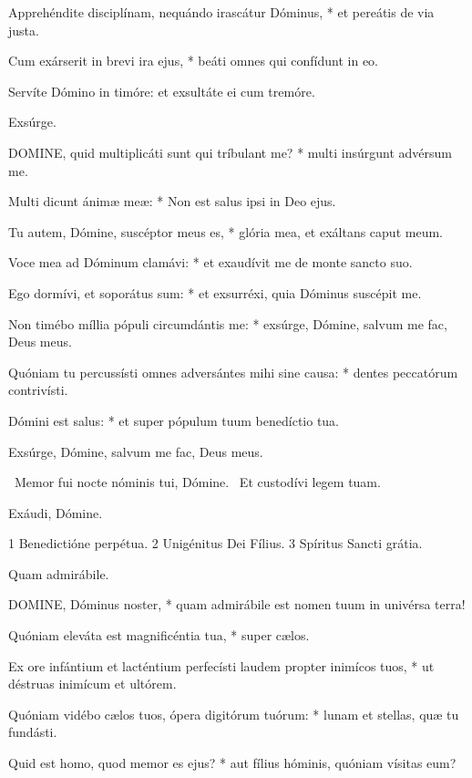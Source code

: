 Apprehéndite disciplínam, nequándo irascátur Dóminus, * et pereátis de via justa.

Cum exárserit in brevi ira ejus, * beáti omnes qui confídunt in eo.

 Servíte Dómino in timóre: et exsultáte ei cum tremóre.

 Exsúrge.


\lettrine[lines=2]{D}{OMINE}, quid multiplicáti sunt qui tríbulant me? * multi insúrgunt advérsum me.

Multi dicunt ánimæ meæ: * Non est salus ipsi in Deo ejus.

Tu autem, Dómine, suscéptor meus es, * glória mea, et exáltans caput meum.

Voce mea ad Dóminum clamávi: * et exaudívit me de monte sancto suo.

Ego dormívi, et soporátus sum: * et exsurréxi, quia Dóminus suscépit me.

Non timébo míllia pópuli circumdántis me: * exsúrge, Dómine, salvum me fac, Deus meus.

Quóniam tu percussísti omnes adversántes mihi sine causa: * dentes peccatórum contrivísti.

Dómini est salus: * et super pópulum tuum benedíctio tua.

 Exsúrge, Dómine, salvum me fac, Deus meus.

\V\ Memor fui nocte nóminis tui, Dómine. \R\ Et custodívi legem tuam.

 Exáudi, Dómine.

 1 Benedictióne perpétua. 2 Unigénitus Dei Fílius. 3 Spíritus Sancti grátia.


 Quam admirábile.


\lettrine[lines=2]{D}{OMINE}, Dóminus noster, * quam admirábile est nomen tuum in univérsa terra!

Quóniam eleváta est magnificéntia tua, * super cælos.

Ex ore infántium et lacténtium perfecísti laudem propter inimícos tuos, * ut déstruas inimícum et ultórem.

Quóniam vidébo cælos tuos, ópera digitórum tuórum: * lunam et stellas, quæ tu fundásti.

Quid est homo, quod memor es ejus? * aut fílius hóminis, quóniam vísitas eum?

